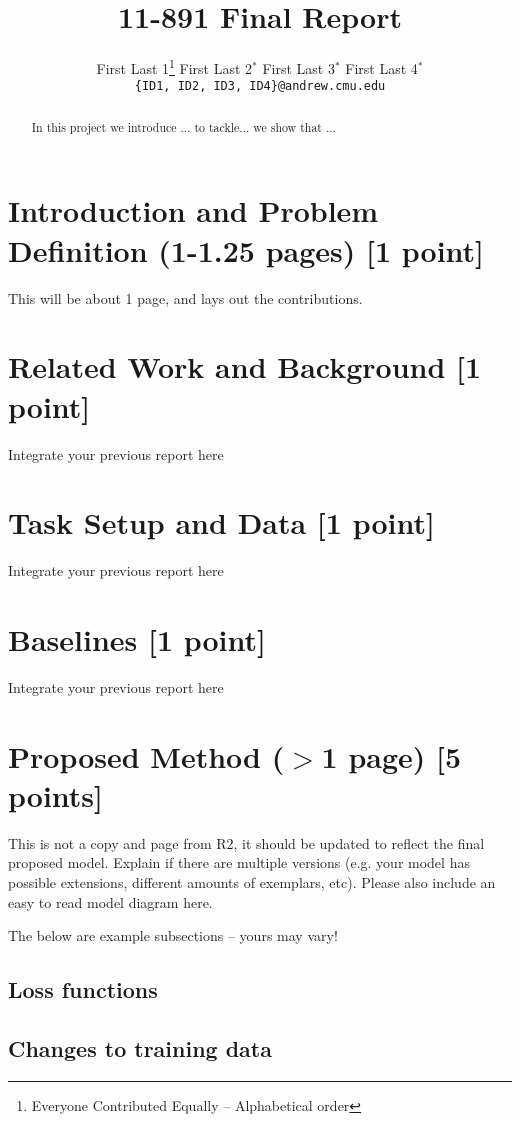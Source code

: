 \documentclass[11pt,a4paper]{article}
\title{11-891 Final Report}
\author{
  First Last 1\thanks{\hspace{4pt}Everyone Contributed Equally -- Alphabetical order} \hspace{2em} First Last 2$^*$ \hspace{2em} First Last 3$^*$ \hspace{2em} First Last 4$^*$ \\
  \texttt{\{ID1, ID2, ID3, ID4\}@andrew.cmu.edu}
  }
\date{}
\begin{document}
\maketitle
\begin{abstract}
In this project we introduce ... to tackle... we show that ...
\end{abstract}

\section{Introduction and Problem Definition (1-1.25 pages) [1 point]}
This will be about 1 page, and lays out the contributions.

\clearpage
\section{Related Work and Background [1 point]}
Integrate your previous report here

\clearpage
\section{Task Setup and Data [1 point]}
Integrate your previous report here

\clearpage
\section{Baselines [1 point]}
Integrate your previous report here

\clearpage
\section{Proposed Method ($>$1 page) [5 points]}
This is not a copy and page from R2, it should be updated to reflect the final proposed model. Explain if there are multiple versions (e.g. your model has possible extensions, different amounts of exemplars, etc).  Please also include an easy to read model diagram here.

The below are example subsections -- yours may vary!

\subsection{Loss functions}

\subsection{Changes to training data}
\end{document}
